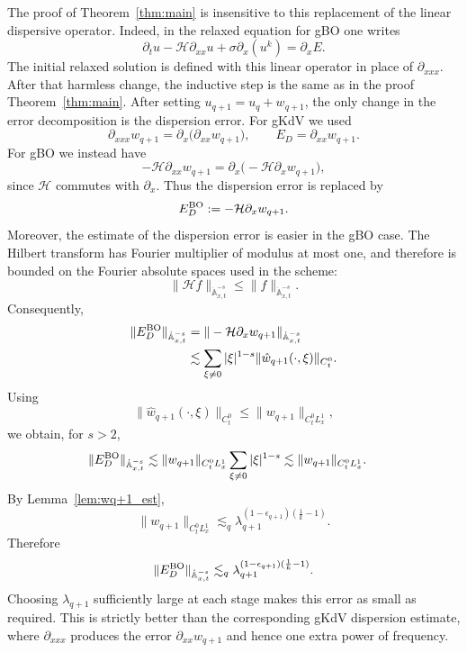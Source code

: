 \documentclass[12pt,reqno,letterpaper]{amsart}
\numberwithin{equation}{section}
\newcommand{\1}{{\bf 1}}
\newcommand{\2}{{\bf 2}}
\theoremstyle{remark}
\theoremstyle{remark}
\begin{document}
The proof of Theorem~\ref{thm:main} is insensitive to this replacement of the
linear dispersive operator.  Indeed, in the relaxed equation for \textsf{gBO} one writes
\[
    \partial_t u-\mathcal H\partial_{xx}u
    +\sigma\partial_x(u^k)
    =
    \partial_x E .
\]
The initial relaxed solution is defined with this linear operator in place of
$\partial_{xxx}$. After that harmless change, the inductive step is the same as in the proof Theorem~\ref{thm:main}. After setting $u_{q+1}=u_q+w_{q+1}$, the only change in the error decomposition is the dispersion error.  For \textsf{gKdV} we used
\[
    \partial_{xxx}w_{q+1}
    =
    \partial_x\bigl(\partial_{xx}w_{q+1}\bigr),
    \qquad
    E_D=\partial_{xx}w_{q+1}.
\]
For \textsf{gBO} we instead have
\[
    -\mathcal H\partial_{xx}w_{q+1}
    =
    \partial_x\bigl(-\mathcal H\partial_xw_{q+1}\bigr),
\]
since $\mathcal H$ commutes with $\partial_x$.  Thus the dispersion error is
replaced by
\[
    E_D^{\rm BO}:=-\mathcal H\partial_xw_{q+1}.
\]
Moreover, the estimate of the dispersion error is easier in the \textsf{gBO} case.  The
Hilbert transform has Fourier multiplier of modulus at most one, and therefore
is bounded on the Fourier absolute spaces used in the scheme:
\[
    \|\mathcal H f\|_{\dot{\mathbb A}_{x,t}^{-s}}
    \leq
    \|f\|_{\dot{\mathbb A}_{x,t}^{-s}}.
\]
Consequently,
\[
\begin{aligned}
    \|E_D^{\rm BO}\|_{\dot{\mathbb{A}}_{x,t}^{-s}}
    &=
    \|-\mathcal H\partial_xw_{q+1}\|_{\dot{\mathbb{A}}_{x,t}^{-s}}  \\
    &\lesssim
    \sum_{\xi\neq0}
    |\xi|^{1-s}
    \|\hat{w}_{q+1}(\cdot,\xi)\|_{C_t^0}.
\end{aligned}
\]
Using
\[
    \|\hat{w}_{q+1}(\cdot,\xi)\|_{C_t^0}
    \leq
    \|w_{q+1}\|_{C_t^0L_x^1},
\]
we obtain, for $s>2$,
\[
\begin{aligned}
    \|E_D^{\rm BO}\|_{\dot{\mathbb{A}}_{x,t}^{-s}}
    &\lesssim
    \|w_{q+1}\|_{C_t^0L_x^1}
    \sum_{\xi \not=0}
    |\xi|^{1-s}  \lesssim
    \|w_{q+1}\|_{C_t^0L_x^1} .
\end{aligned}
\]
By Lemma~\ref{lem:wq+1_est},
\[
    \|w_{q+1}\|_{C_t^0L_x^1}
    \lesssim_q
    \lambda_{q+1}^{(1-\epsilon_{q+1})(\frac1k-1)}.
\]
Therefore
\[
    \|E_D^{\rm BO}\|_{\dot{\mathbb{A}}_{x,t}^{-s}}
    \lesssim_q
    \lambda_{q+1}^{(1-\epsilon_{q+1})(\frac1k-1)}.
\]
Choosing $\lambda_{q+1}$ sufficiently large at each stage makes this error as small as required.  This is strictly better than the corresponding \textsf{gKdV} dispersion estimate, where $\partial_{xxx}$ produces the error $\partial_{xx}w_{q+1}$ and hence one extra power of frequency.
\end{document}
